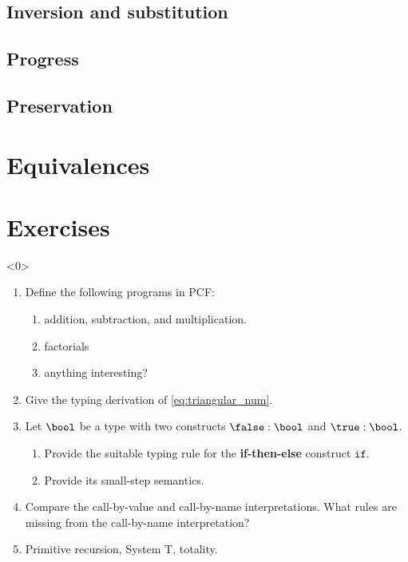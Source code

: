 \subsection{Inversion and substitution}
\begin{frame}
\end{frame}
\subsection{Progress}
\begin{frame}
\end{frame}
\subsection{Preservation}
\begin{frame}
\end{frame}
\section{Equivalences}
\begin{frame}
\end{frame}
\section*{Exercises}
\begin{frame}<0>
  \begin{enumerate}
    \item Define the following programs in PCF:
      \begin{enumerate}
        \item addition, subtraction, and multiplication. 
        \item factorials
        \item anything interesting? 
      \end{enumerate}
    \item Give the typing derivation of \eqref{eq:triangular_num}.
    \item Let $\bool$ be a type with two constructs $\false : \bool$
      and $\true : \bool$.
      \begin{enumerate}
        \item Provide the suitable typing rule for
          the \textbf{if-then-else} construct
          $\mathtt{if}$.
        \item Provide its small-step semantics.
      \end{enumerate}
    \item Compare the call-by-value and call-by-name interpretations. What
      rules are missing from the call-by-name interpretation?
    \item Primitive recursion, System T, totality. 
  \end{enumerate}
\end{frame}

